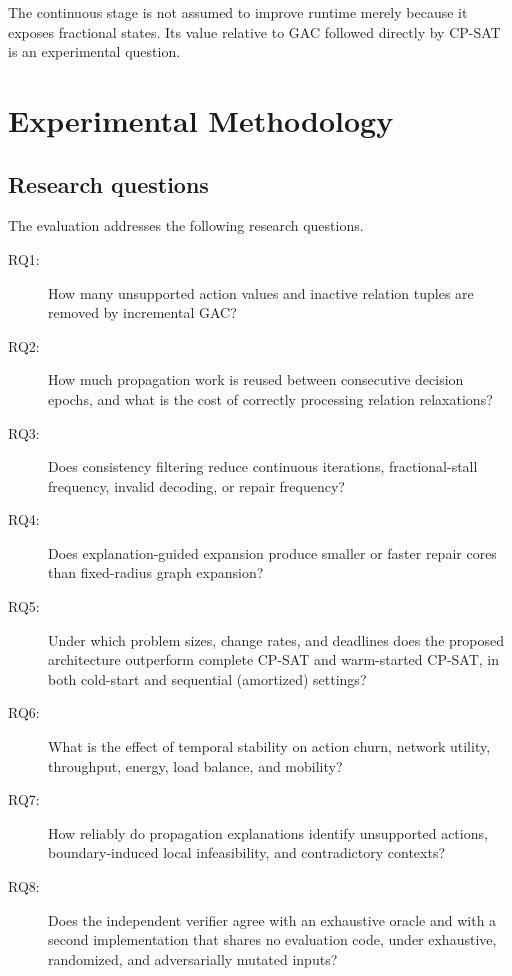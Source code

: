 \documentclass[pdflatex,sn-mathphys-num,iicol,oneside]{sn-jnl}
\begin{document}
The continuous stage is not assumed to improve runtime merely because
it exposes fractional states. Its value relative to GAC followed
directly by CP-SAT is an experimental question.


\section{Experimental Methodology}
\label{sec:experiments}

\subsection{Research questions}

The evaluation addresses the following research questions.

\begin{description}

    \item[RQ1:]
    How many unsupported action values and inactive relation tuples
    are removed by incremental GAC?

    \item[RQ2:]
    How much propagation work is reused between consecutive decision
    epochs, and what is the cost of correctly processing relation
    relaxations?

    \item[RQ3:]
    Does consistency filtering reduce continuous iterations,
    fractional-stall frequency, invalid decoding, or repair frequency?

    \item[RQ4:]
    Does explanation-guided expansion produce smaller or faster
    repair cores than fixed-radius graph expansion?

    \item[RQ5:]
    Under which problem sizes, change rates, and deadlines does the
    proposed architecture outperform complete CP-SAT and warm-started
    CP-SAT, in both cold-start and sequential (amortized) settings?

    \item[RQ6:]
    What is the effect of temporal stability on action churn, network
    utility, throughput, energy, load balance, and mobility?

    \item[RQ7:]
    How reliably do propagation explanations identify unsupported
    actions, boundary-induced local infeasibility, and contradictory
    contexts?

    \item[RQ8:]
    Does the independent verifier agree with an exhaustive oracle and
    with a second implementation that shares no evaluation code, under
    exhaustive, randomized, and adversarially mutated inputs?

\end{description}
\end{document}
